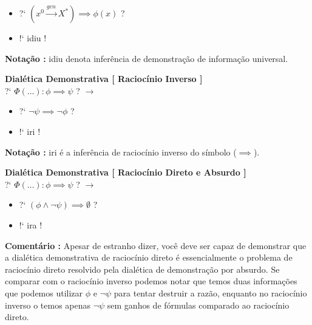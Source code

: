 \documentclass[10pt,a4paper]{report}
\begin{document}
\begin{itemize}
	\item[ (1) ] ?` $ ( x^0 \overset{gen}{\rightarrow} X^* ) \implies \phi(x) $ ?
	\item[ (2) ] !` idiu !
\end{itemize}

\textbf{Notação :} idiu denota inferência de demonstração de informação universal.

\hspace{\baselineskip}

\textbf{Dialética Demonstrativa [ Raciocínio Inverso ]}\\

?` $ \Phi( \dots ) : \phi \implies \psi $ ? $\rightarrow$

\begin{itemize}
	\item[ (1) ] ?` $ \neg \psi \implies \neg \phi $  ? 
	\item[ (2) ] !` iri !
\end{itemize}

\textbf{Notação :} iri é a inferência de raciocínio inverso do símbolo ($\implies$).

\hspace{\baselineskip}

\textbf{Dialética Demonstrativa [ Raciocínio Direto e Absurdo ]}\\

?` $ \Phi(\dots) : \phi \implies \psi $  ? $\rightarrow$ 

\begin{itemize}
	\item[ (1) ] ?` $ (\phi \wedge \neg \psi) \implies \emptyset  $ ?
	\item[ (2) ] !` ira !
\end{itemize}

\textbf{Comentário :} Apesar de estranho dizer, você deve ser capaz de demonstrar que a dialética demonstrativa de raciocínio direto é essencialmente o problema de raciocínio direto resolvido pela dialética de demonstração por absurdo. Se comparar com o raciocínio inverso podemos notar que temos duas informações que podemos utilizar $\phi$ e $\neg \psi$ para tentar destruir a razão, enquanto no raciocínio inverso o temos apenas $\neg \psi$ sem ganhos de fórmulas comparado ao raciocínio direto.\\
\end{document}
